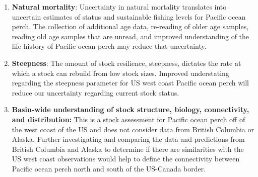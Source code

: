 \documentclass[12pt,]{article}
\begin{document}
\begin{enumerate}

\item \textbf{Natural mortality}: Uncertainty in natural mortality translates into uncertain estimates of status and sustainable fishing levels for Pacific ocean perch. The collection of additional age data, re-reading of older age samples, reading old age samples that are unread, and improved understanding of the life history of Pacific ocean perch may reduce that uncertainty.

\item \textbf{Steepness}: The amount of stock resilience, steepness, dictates the rate at which a stock can rebuild from low stock sizes.  Improved understating regarding the steepness parameter for US west coast Pacific ocean perch will reduce our uncertainty regarding current stock status.

\item \textbf{Basin-wide understanding of stock structure, biology, connectivity, and distribution:} This is a stock assessment for Pacific ocean perch off of the west coast of the US and does not consider data from British Columbia or Alaska. Further investigating and comparing the data and predictions from British Columbia and Alaska to determine if there are similarities with the US west coast observations would help to define the connectivity between Pacific ocean perch north and south of the US-Canada border.

\end{enumerate}
\end{document}
